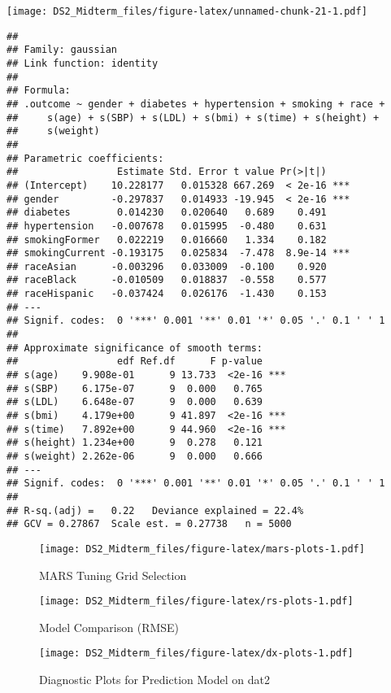 \documentclass[
]{article}
\begin{document}
\texttt{[image: DS2\_Midterm\_files/figure-latex/unnamed-chunk-21-1.pdf]}

\begin{verbatim}
## 
## Family: gaussian 
## Link function: identity 
## 
## Formula:
## .outcome ~ gender + diabetes + hypertension + smoking + race + 
##     s(age) + s(SBP) + s(LDL) + s(bmi) + s(time) + s(height) + 
##     s(weight)
## 
## Parametric coefficients:
##                 Estimate Std. Error t value Pr(>|t|)    
## (Intercept)    10.228177   0.015328 667.269  < 2e-16 ***
## gender         -0.297837   0.014933 -19.945  < 2e-16 ***
## diabetes        0.014230   0.020640   0.689    0.491    
## hypertension   -0.007678   0.015995  -0.480    0.631    
## smokingFormer   0.022219   0.016660   1.334    0.182    
## smokingCurrent -0.193175   0.025834  -7.478  8.9e-14 ***
## raceAsian      -0.003296   0.033009  -0.100    0.920    
## raceBlack      -0.010509   0.018837  -0.558    0.577    
## raceHispanic   -0.037424   0.026176  -1.430    0.153    
## ---
## Signif. codes:  0 '***' 0.001 '**' 0.01 '*' 0.05 '.' 0.1 ' ' 1
## 
## Approximate significance of smooth terms:
##                 edf Ref.df      F p-value    
## s(age)    9.908e-01      9 13.733  <2e-16 ***
## s(SBP)    6.175e-07      9  0.000   0.765    
## s(LDL)    6.648e-07      9  0.000   0.639    
## s(bmi)    4.179e+00      9 41.897  <2e-16 ***
## s(time)   7.892e+00      9 44.960  <2e-16 ***
## s(height) 1.234e+00      9  0.278   0.121    
## s(weight) 2.262e-06      9  0.000   0.666    
## ---
## Signif. codes:  0 '***' 0.001 '**' 0.01 '*' 0.05 '.' 0.1 ' ' 1
## 
## R-sq.(adj) =   0.22   Deviance explained = 22.4%
## GCV = 0.27867  Scale est. = 0.27738   n = 5000
\end{verbatim}

\begin{figure}
\centering
\texttt{[image: DS2\_Midterm\_files/figure-latex/mars-plots-1.pdf]}
\caption{\label{fig:mars-plots}MARS Tuning Grid Selection}
\end{figure}

\begin{figure}
\centering
\texttt{[image: DS2\_Midterm\_files/figure-latex/rs-plots-1.pdf]}
\caption{\label{fig:rs-plots}Model Comparison (RMSE)}
\end{figure}

\begin{figure}
\centering
\texttt{[image: DS2\_Midterm\_files/figure-latex/dx-plots-1.pdf]}
\caption{\label{fig:dx-plots}Diagnostic Plots for Prediction Model on dat2}
\end{figure}
\end{document}
